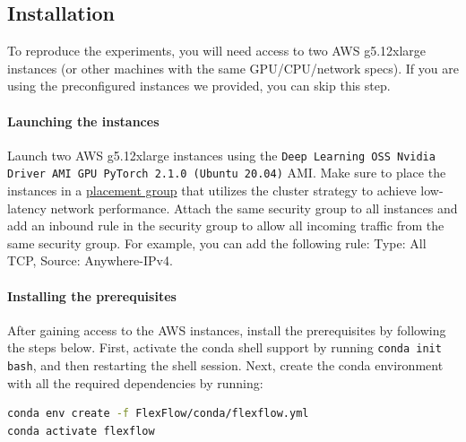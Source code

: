 \subsection{Installation}


To reproduce the experiments, you will need access to two AWS g5.12xlarge instances (or other machines with the same GPU/CPU/network specs). If you are using the preconfigured instances we provided, you can skip this step. 
\paragraph{Launching the instances}
Launch two AWS g5.12xlarge instances using the \texttt{Deep Learning OSS Nvidia Driver AMI GPU PyTorch 2.1.0 (Ubuntu 20.04)} AMI. Make sure to place the instances in a \href{https://docs.aws.amazon.com/AWSEC2/latest/UserGuide/placement-groups.html}{placement group} that utilizes the cluster strategy to achieve low-latency network performance. Attach the same security group to all instances and add an inbound rule in the security group to allow all incoming traffic from the same security group. For example, you can add the following rule: Type: All TCP, Source: Anywhere-IPv4.

\paragraph{Installing the prerequisites}
After gaining access to the AWS instances, install the prerequisites by following the steps below. First, activate the conda shell support by running \texttt{conda init bash}, and then restarting the shell session.
Next, create the conda environment with all the required dependencies by running:
\begin{lstlisting}[language=sh]
conda env create -f FlexFlow/conda/flexflow.yml
conda activate flexflow
\end{lstlisting}

